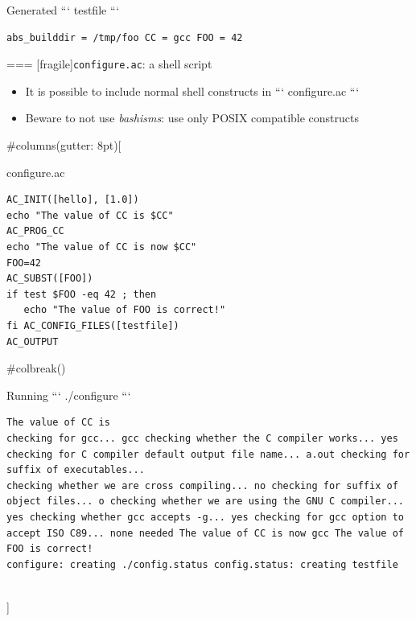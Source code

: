 \begin{block}{Generated ``` testfile ```}
\begin{verbatim}
abs_builddir = /tmp/foo CC = gcc FOO = 42
\end{verbatim}
\end{block}



=== [fragile]{{\tt configure.ac}: a shell script}

\begin{itemize}
\item It is possible to include normal shell constructs in
  ``` configure.ac ```
\item Beware to not use {\em bashisms}: use only POSIX compatible
  constructs
\end{itemize}


#columns(gutter: 8pt)[

\begin{block}{configure.ac}
{\tiny
\begin{verbatim}
AC_INIT([hello], [1.0])
echo "The value of CC is $CC"
AC_PROG_CC
echo "The value of CC is now $CC"
FOO=42
AC_SUBST([FOO])
if test $FOO -eq 42 ; then
   echo "The value of FOO is correct!"
fi AC_CONFIG_FILES([testfile])
AC_OUTPUT
\end{verbatim}}
\end{block}

 #colbreak()

\begin{block}{Running ``` ./configure ```}
\begin{verbatim}
The value of CC is 
checking for gcc... gcc checking whether the C compiler works... yes checking for C compiler default output file name... a.out checking for suffix of executables... 
checking whether we are cross compiling... no checking for suffix of object files... o checking whether we are using the GNU C compiler... yes checking whether gcc accepts -g... yes checking for gcc option to accept ISO C89... none needed The value of CC is now gcc The value of FOO is correct!
configure: creating ./config.status config.status: creating testfile
\end{verbatim}
\end{block}

\\]




